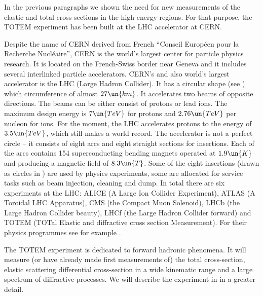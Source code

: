 In the previous paragraphs we shown the need for new measurements of the elastic and total cross-sections in the high-energy regions. For that purpose, the TOTEM experiment has been built at the LHC accelerator at CERN.

Despite the name of CERN derived from French ``Conseil Europ\' een pour la Recherche Nucl\' eaire'', CERN  is the world's largest center for particle physics research. It is located on the French-Swiss border near Geneva and it includes several interlinked particle accelerators. CERN's and also world's largest accelerator is the LHC  (Large Hadron Collider). It has a circular shape (see ) which circumference of almost $27\un{km}$. It accelerates two beams of opposite directions. The beams can be either consist of protons or lead ions. The maximum design energy is $7\un{TeV}$ for protons and $2.76\un{TeV}$ per nucleon for ions. For the moment, the LHC accelerates protons to the energy of $3.5\un{TeV}$, which still makes a world record. The accelerator is not a perfect circle -- it consists of eight arcs and eight straight sections for insertions. Each of the arcs contains 154 superconducting bending magnets operated at $1.9\un{K}$ and producing a magnetic field of $8.3\un{T}$. Some of the eight insertions (drawn as circles in ) are used by physics experiments, some are allocated for service tasks such as beam injection, cleaning and dump. In total there are six experiments at the LHC: ALICE (A Large Ion Collider Experiment), ATLAS (A Toroidal LHC Apparatus), CMS (the Compact Muon
Solenoid), LHCb (the Large Hadron Collider beauty), LHCf (the Large Hadron Collider forward) and TOTEM (TOTal Elastic and diffractive cross section Measurement). For their physics programmes see for example .

The TOTEM experiment is dedicated to forward hadronic phenomena. It will measure (or have already made first measurements of) the total cross-section, elastic scattering differential cross-section in a wide kinematic range and a large spectrum of diffractive processes. We will describe the experiment in  in a greater detail.





